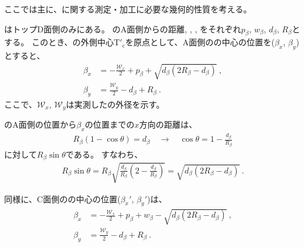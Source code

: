 

ここでは主に、\textbf{\EndFaceBoring}に関する測定・加工に必要な幾何的性質を考える。



\EndFaceBoring はトップD面側のみにある。
\EndFaceBoring のA面側からの距離, \EndFaceBoringWidth, \EndFaceBoringDepth, \EndFaceBoringCornerR をそれぞれ$p_\beta$, $w_\beta$, $d_\beta$, $R_\beta$とする。
このとき、\TopEndFace の外側中心T$'_\mathrm c$を原点として、A面側の\EndFaceBoringCornerR の中心の位置を($\beta_x$, $\beta_y$)とすると、
\begin{align*}
  \beta_x &= -\frac{\mathcal W_x}2+p_\beta+\sqrt{d_\beta(2R_\beta-d_\beta)}\ ,\\
  \beta_y &= \frac{\mathcal W_y}2-d_\beta+R_\beta\ .
\end{align*}
ここで、$\mathcal W_x$, $\mathcal W_y$は実測した\TopEndFace の外径を示す。
\begin{hosoku}
\EndFaceBoring のA面側の位置から$\beta_x$の位置までの$x$方向の距離は、
\begin{align*}
  R_\beta(1-\cos\theta) = d_\beta\quad
  \longrightarrow\quad
  \cos\theta = 1-\frac{d_\beta}{R_\beta}
\end{align*}
に対して$R_\beta\sin\theta$である。
すなわち、
\begin{align*}
  R_\beta\sin\theta
  = R_\beta\sqrt{\frac{d_\beta}{R_\beta}\left(2-\frac{d_\beta}{R_\beta}\right)}
  = \sqrt{d_\beta(2R_\beta-d_\beta)}\ .
\end{align*}
\end{hosoku}
同様に、C面側の\EndFaceBoringCornerR の中心の位置($\beta_x'$, $\beta_y'$)は、
\begin{align*}
  \beta_x &= -\frac{\mathcal W_x}2+p_\beta+w_\beta-\sqrt{d_\beta(2R_\beta-d_\beta)}\ ,\\
  \beta_y &= \frac{\mathcal W_y}2-d_\beta+R_\beta\ .
\end{align*}
